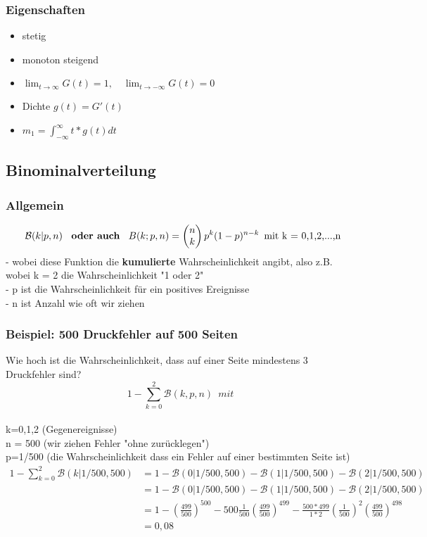 \documentclass{article}
\begin{document}
\subsubsection{Eigenschaften}
\begin{itemize}		
	\item stetig
	\item monoton steigend
	\item $\lim_{t \to \infty} G(t) = 1, \quad \lim_{t \to -\infty} G(t) = 0$
	\item Dichte $g(t) = G'(t)$
	\item $m_1 = \int_{-\infty}^{\infty}t*g(t)dt$
\end{itemize}
\subsection{Binominalverteilung}
\subsubsection{Allgemein}
\[
	\mathcal{B}(k | p,n) \enspace \textbf{ oder auch } \enspace B(k;p,n) =
\begin{pmatrix} n \\ k \end{pmatrix} p^k(1-p)^{n-k} \enspace \newline
\text{mit k = 0,1,2,...,n} \]
- wobei diese Funktion die \textbf{kumulierte} Wahrscheinlichkeit angibt, also z.B.
wobei k = 2 die Wahrscheinlichkeit "1 oder 2"
\\ - p ist die Wahrscheinlichkeit f\"ur ein positives Ereignisse
\\ - n ist Anzahl wie oft wir ziehen

\subsubsection{Beispiel: 500 Druckfehler auf 500 Seiten}
Wie hoch ist die Wahrscheinlichkeit, dass auf einer Seite mindestens 3 Druckfehler
sind?
\[
1- \sum_{k=0}^{2} \mathcal{B}(k,p,n) \enspace mit \enspace \] \\
k=0,1,2 (Gegenereignisse)\\ n = 500
(wir ziehen Fehler "ohne zur\"ucklegen") \\ p=1/500 (die Wahrscheinlichkeit dass
ein Fehler auf einer bestimmten Seite ist)\\
\begin{equation*}
	\begin{split}
		1- \sum_{k=0}^{2} \mathcal{B}(k|1/500,500)& = 1 - \mathcal{B}(0|1/500,500) - \mathcal{B}(1|1/500,500) - \mathcal{B}(2|
		1/500,500) \\
		& = 1 -  \mathcal{B}(0|1/500,500) - \mathcal{B}(1|1/500,500) - \mathcal{B}(2|
		1/500,500) \\
		& = 1 - \left( \frac{499}{500} \right) ^{500} - 500\frac{1}{500}\left(\frac{499}{500}\right)^{499} - \frac{500*499}{1*2}\left( \frac{1}{500} \right) ^2 \left( \frac{499}{500} \right) ^{498} \\ & = 0,08
	\end{split}
\end{equation*}
\end{document}
